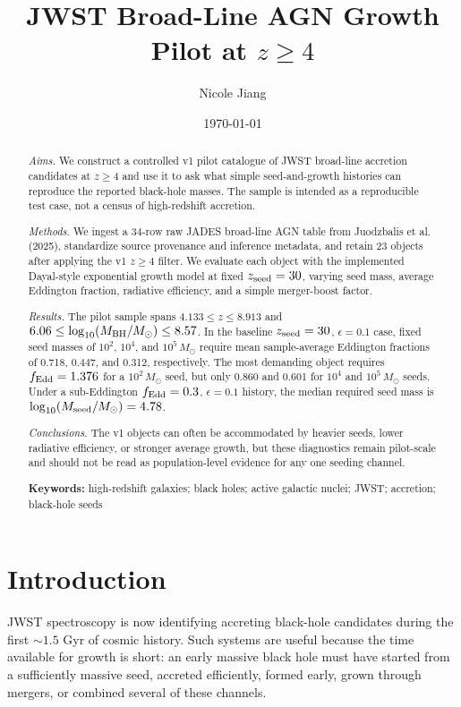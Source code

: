 \documentclass[letterpaper,12pt]{article}
\begin{document}
\title{JWST Broad-Line AGN Growth Pilot at $z \geq 4$}
\author{Nicole Jiang}
\date{\today}
\maketitle

\begin{abstract}
\textit{Aims.} We construct a controlled v1 pilot catalogue of JWST broad-line accretion candidates at $z\geq4$ and use it to ask what simple seed-and-growth histories can reproduce the reported black-hole masses. The sample is intended as a reproducible test case, not a census of high-redshift accretion.

\textit{Methods.} We ingest a 34-row raw JADES broad-line AGN table from Juodzbalis et al. (2025), standardize source provenance and inference metadata, and retain 23 objects after applying the v1 $z\geq4$ filter. We evaluate each object with the implemented Dayal-style exponential growth model at fixed $z_{\rm seed}=30$, varying seed mass, average Eddington fraction, radiative efficiency, and a simple merger-boost factor.

\textit{Results.} The pilot sample spans $4.133 \leq z \leq 8.913$ and $6.06 \leq \log_{10}(M_{\rm BH}/M_\odot) \leq 8.57$. In the baseline $z_{\rm seed}=30$, $\epsilon=0.1$ case, fixed seed masses of $10^2$, $10^4$, and $10^5\,M_\odot$ require mean sample-average Eddington fractions of 0.718, 0.447, and 0.312, respectively. The most demanding object requires $f_{\rm Edd}=1.376$ for a $10^2\,M_\odot$ seed, but only 0.860 and 0.601 for $10^4$ and $10^5\,M_\odot$ seeds. Under a sub-Eddington $f_{\rm Edd}=0.3$, $\epsilon=0.1$ history, the median required seed mass is $\log_{10}(M_{\rm seed}/M_\odot)=4.78$.

\textit{Conclusions.} The v1 objects can often be accommodated by heavier seeds, lower radiative efficiency, or stronger average growth, but these diagnostics remain pilot-scale and should not be read as population-level evidence for any one seeding channel.

\textbf{Keywords:} high-redshift galaxies; black holes; active galactic nuclei; JWST; accretion; black-hole seeds
\end{abstract}

\section{Introduction}

JWST spectroscopy is now identifying accreting black-hole candidates during the first $\sim1.5$ Gyr of cosmic history. Such systems are useful because the time available for growth is short: an early massive black hole must have started from a sufficiently massive seed, accreted efficiently, formed early, grown through mergers, or combined several of these channels.
\end{document}
